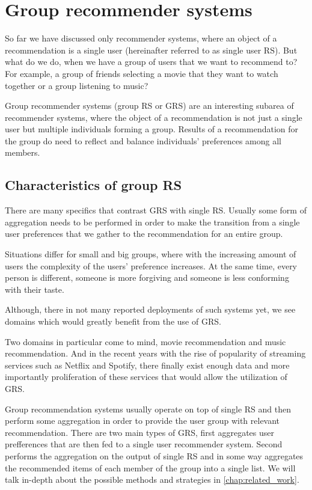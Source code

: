 
\section{Group recommender systems} \label{sec:01_group_rec_sys}

So far we have discussed only recommender systems, where an object of a recommendation is a single user (hereinafter referred to as single user RS). But what do we do, when we have a group of users that we want to recommend to? For example, a group of friends selecting a movie that they want to watch together or a group listening to music?  %

Group recommender systems (group RS or GRS) are an interesting subarea of recommender systems, where the object of a recommendation is not just a single user but multiple individuals forming a group. Results of a recommendation for the group do need to reflect and balance individuals' preferences among all members.


\subsection{Characteristics of group RS}

There are many specifics that contrast GRS with single RS. Usually some form of aggregation needs to be performed in order to make the transition from a single user preferences that we gather to the recommendation for an entire group.

Situations differ for small and big groups, where with the increasing amount of users the complexity of the users' preference increases. At the same time, every person is different, someone is more forgiving and someone is less conforming with their taste.

Although, there in not many reported deployments of such systems yet, we see domains which would greatly benefit from the use of GRS.

Two domains in particular come to mind, movie recommendation and music recommendation. And in the recent years with the rise of popularity of streaming services such as Netflix and Spotify, there finally exist enough data and more importantly proliferation of these services that would allow the utilization of GRS.

Group recommendation systems usually operate on top of single RS and then perform some aggregation in order to provide the user group with relevant recommendation. There are two main types of GRS, first aggregates user prefferences that are then fed to a single user recommender system. Second performs the aggregation on the output of single RS and in some way aggregates the recommended items of each member of the group into a single list. We will talk in-depth about the possible methods and strategies in \ref{chap:related_work}.


